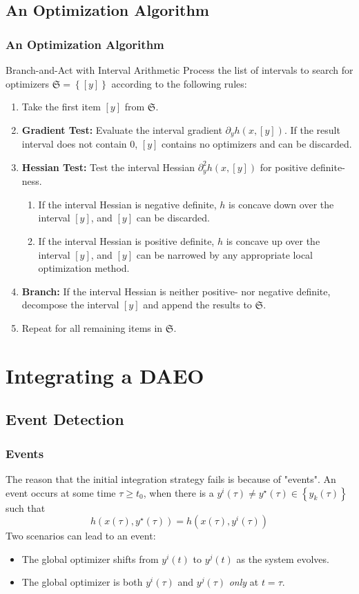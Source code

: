 \documentclass[10pt]{beamer}
\newcommand{\frS}{\ensuremath{\mathfrak{S}}}
\begin{document}
\subsection{An Optimization Algorithm}
\begin{frame}
	\frametitle{An Optimization Algorithm}
	\begin{block}{Branch-and-Act with Interval Arithmetic}
		Process the list of intervals to search for optimizers $\frS = \left\{[y]\right\}$ according to the following rules:
		\begin{enumerate} 
			\item Take the first item $[y]$ from $\frS$.
			\item \textbf{Gradient Test:} Evaluate the interval gradient $\partial_y h(x, [y])$. If the result interval does not contain $0$, $[y]$ contains no optimizers and can be discarded.
			\item \textbf{Hessian Test:} Test the interval Hessian $\partial^2_y h(x, [y])$ for positive definite-ness.
			\begin{enumerate}
				\item If the interval Hessian is negative definite, $h$ is concave down over the interval $[y]$, and $[y]$ can be discarded.
				\item If the interval Hessian is positive definite, $h$ is concave up over the interval $[y]$, and $[y]$ can be narrowed by any appropriate local optimization method.
			\end{enumerate}
			\item \textbf{Branch:} If the interval Hessian is neither positive- nor negative definite, decompose the interval $[y]$ and append the results to $\frS$.
			\item Repeat for all remaining items in $\frS$.
		\end{enumerate}
	\end{block}
\end{frame}
\section{Integrating a DAEO}
\subsection{Event Detection}
\begin{frame}
	\frametitle{Events}
	The reason that the initial integration strategy fails is because of "events".
	\vfill
	An event occurs at some time $\tau \geq t_0$, when there is a $y^i(\tau)\neq y^\star(\tau)\in\left\{y_k(\tau)\right\}$ such that
	\begin{equation}
		h(x(\tau), y^\star(\tau)) = h(x(\tau), y^i(\tau))
	\end{equation}
	\vfill
	Two scenarios can lead to an event:
	\begin{itemize}
		\item The global optimizer shifts from $y^i(t)$ to $y^j(t)$ as the system evolves.
		\item The global optimizer is both $y^i(\tau)$ and $y^j(\tau)$ \textit{only} at $t=\tau$.
	\end{itemize}
	\vfill
\end{frame}
\end{document}
